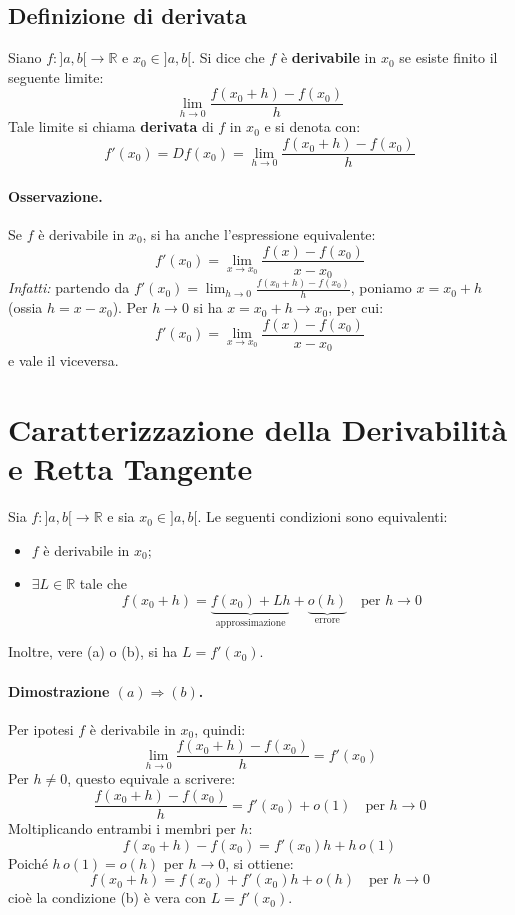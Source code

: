 \subsection{Definizione di derivata}

\begin{defbox}
Siano $f : ]a, b[ \to \mathbb{R}$ e $x_0 \in ]a, b[$. Si dice che $f$ è \textbf{derivabile} in $x_0$ se esiste finito il seguente limite:
\[
\lim_{h \to 0} \frac{f(x_0 + h) - f(x_0)}{h}
\]
Tale limite si chiama \textbf{derivata} di $f$ in $x_0$ e si denota con:
\[
f'(x_0) = D f(x_0) = \lim_{h \to 0} \frac{f(x_0 + h) - f(x_0)}{h}
\]
\end{defbox}

\paragraph{Osservazione.} Se $f$ è derivabile in $x_0$, si ha anche l'espressione equivalente:
\[
f'(x_0) = \lim_{x \to x_0} \frac{f(x) - f(x_0)}{x - x_0}
\]
\textit{Infatti:} partendo da $f'(x_0) = \lim_{h \to 0} \frac{f(x_0 + h) - f(x_0)}{h}$, poniamo $x = x_0 + h$ (ossia $h = x - x_0$). Per $h \to 0$ si ha $x = x_0 + h \to x_0$, per cui:
\[
f'(x_0) = \lim_{x \to x_0} \frac{f(x) - f(x_0)}{x - x_0}
\]
e vale il viceversa.

\section{Caratterizzazione della Derivabilità e Retta Tangente}

\begin{propbox}
Sia $f : ]a, b[ \to \mathbb{R}$ e sia $x_0 \in ]a, b[$. Le seguenti condizioni sono equivalenti:
\begin{itemize}
    \item[(a)] $f$ è derivabile in $x_0$;
    \item[(b)] $\exists L \in \mathbb{R}$ tale che
    \[
    f(x_0 + h) = \underbrace{f(x_0) + Lh}_{\text{approssimazione}} + \underbrace{o(h)}_{\text{errore}} \quad \text{per } h \to 0
    \]
\end{itemize}
Inoltre, vere (a) o (b), si ha $L = f'(x_0)$.
\end{propbox}

\paragraph{Dimostrazione $(a) \Rightarrow (b)$.}
Per ipotesi $f$ è derivabile in $x_0$, quindi:
\[
\lim_{h \to 0} \frac{f(x_0 + h) - f(x_0)}{h} = f'(x_0)
\]
Per $h \neq 0$, questo equivale a scrivere:
\[
\frac{f(x_0 + h) - f(x_0)}{h} = f'(x_0) + o(1) \quad \text{per } h \to 0
\]
Moltiplicando entrambi i membri per $h$:
\[
f(x_0 + h) - f(x_0) = f'(x_0)h + h \, o(1)
\]
Poiché $h \, o(1) = o(h)$ per $h \to 0$, si ottiene:
\[
f(x_0 + h) = f(x_0) + f'(x_0)h + o(h) \quad \text{per } h \to 0
\]
cioè la condizione (b) è vera con $L = f'(x_0)$.

